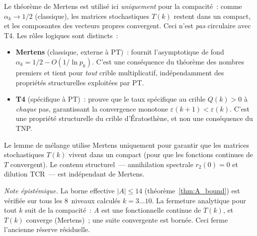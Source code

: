 \documentclass[12pt,a4paper]{article}
\begin{document}
\begin{remarque}
\label{rem:mertens_role}
Le théorème de Mertens est utilisé ici \emph{uniquement} pour la
compacité~: comme $\alpha_k \to 1/2$ (classique), les matrices
stochastiques $T(k)$ restent dans un compact, et les composantes des
vecteurs propres convergent. Ceci n'est \emph{pas} circulaire avec T4.
Les rôles logiques sont distincts~:
\begin{itemize}[nosep]
\item \textbf{Mertens} (classique, externe à PT)~: fournit
  l'asymptotique de fond $\alpha_k = 1/2 - O(1/\ln p_k)$. C'est une
  conséquence du théorème des nombres premiers et tient pour
  \emph{tout} crible multiplicatif, indépendamment des propriétés
  structurelles exploitées par PT.
\item \textbf{T4} (spécifique à PT)~: prouve que le taux spécifique
  au crible $Q(k) > 0$ à \emph{chaque} pas, garantissant la
  convergence monotone $\varepsilon(k+1) < \varepsilon(k)$. C'est une
  propriété structurelle du crible d'Ératosthène, et non une
  conséquence du TNP.
\end{itemize}
Le lemme de mélange utilise Mertens uniquement pour garantir que les
matrices stochastiques $T(k)$ vivent dans un compact (pour que les
fonctions continues de $T$ convergent). Le contenu structurel~---
annihilation spectrale $r_2(0) = 0$ et dilution TCR~--- est
indépendant de Mertens.

\emph{Note épistémique.} La borne effective $|A| \leq 14$
(théorème~\ref{thm:A_bound}) est vérifiée sur tous les $8$~niveaux
calculés $k = 3\ldots 10$. La fermeture analytique pour tout $k$ suit
de la compacité~: $A$ est une fonctionnelle continue de $T(k)$, et
$T(k)$ converge (Mertens)~; une suite convergente est bornée. Ceci
ferme l'ancienne réserve résiduelle.
\end{remarque}
\end{document}
